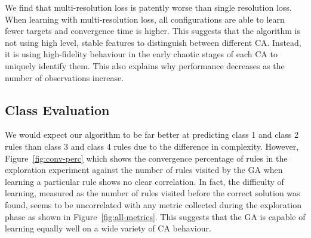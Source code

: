 \begin{table} 
    \centering\hfill
    \hfill
    \hfill
    \label{tab:multires-loss}
\end{table}

We find that multi-resolution loss is patently worse than single resolution loss. When learning with multi-resolution loss, all configurations are able to learn fewer targets and convergence time is higher. This suggests that the algorithm is not using high level, stable features to distinguish between different CA. Instead, it is using high-fidelity behaviour in the early chaotic stages of each CA to uniquely identify them. This also explains why performance decreases as the number of observations increase.

\subsection{Class Evaluation}

We would expect our algorithm to be far better at predicting class 1 and class 2 rules than class 3 and class 4 rules due to the difference in complexity. However, Figure~\ref{fig:conv-perc} which shows the convergence percentage of rules in the exploration experiment against the number of rules visited by the GA when learning a particular rule shows no clear correlation. In fact, the difficulty of learning, measured as the number of rules visited before the correct solution was found, seems to be uncorrelated with any metric collected during the exploration phase as shown in Figure~\ref{fig:all-metrics}. This suggests that the GA is capable of learning equally well on a wide variety of CA behaviour.

